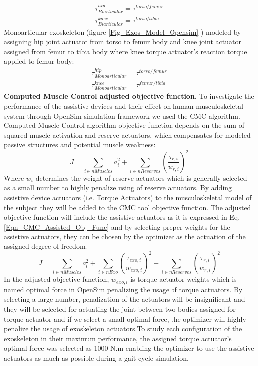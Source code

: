 \documentclass[10pt,letterpaper]{article}
\begin{document}
\begin{align}\label{Eqn_Biarticular_Torque_Act}
\tau^{hip}_{Biarticular} = \tau^{torso/femur}\\
\tau^{knee}_{Biarticular} = \tau^{torso/tibia}
\end{align}
Monoarticular exoskeleton (figure \ref{Fig_Exos_Model_Opensim} ) modeled by assigning hip joint actuator from torso to femur body and knee joint actuator assigned from femur to tibia body where knee torque actuator's reaction torque applied to femur body:
\begin{align}\label{Eqn_Monoarticular_Torque_Act}
\tau^{hip}_{Monoarticular} = \tau^{torso/femur}\\
\tau^{knee}_{Monoarticular} = \tau^{femur/tibia}
\end{align}
\newline
\newline
\textbf{Computed Muscle Control adjusted objective function.} To investigate the performance of the assistive devices and their effect on human musculoskeletal system through OpenSim simulation framework we used the CMC algorithm. Computed Muscle Control algorithm objective function depends on the sum of squared muscle activation and reserve actuators, which compensates for modeled passive structures and potential muscle weakness\cite{93}:
\begin{equation}\label{Eqn_CMC_Normal_Obj_Func}
J = \sum_{i\in nMuscles} a_{i}^{2} + \sum_{i \in nReserves} (\frac{\tau_{r,i}}{w_{r,i}})^2
\end{equation}
Where $w_i$ determines the weight of reserve actuators which is generally selected as a small number to highly penalize using of reserve actuators. By adding assistive device actuators (i.e. Torque Actuators) to the musculoskeletal model of the subject they will be added to the CMC tool objective function. The adjusted objective function will include the assistive actuators as it is expressed in Eq. \eqref{Eqn_CMC_Assisted_Obj_Func} and by selecting proper weights for the assistive actuators, they can be chosen by the optimizer as the actuation of the assigned degree of freedom.
\begin{equation}\label{Eqn_CMC_Assisted_Obj_Func}
	J = \sum_{i\in nMuscles} a_{i}^{2} + \sum_{i \in nExo} \left(\frac{\tau_{exo,i}}{w_{exo,i}}\right)^{2} +  \sum_{i \in nReserves} \left(\frac{\tau_{r,i}}{w_{r,i}}\right)^2
\end{equation}
In the adjusted objective function, $w_{exo,i}$ is torque actuator weights which is named optimal force in OpenSim \cite{93} penalizing the usage of torque actuators. By selecting a large number, penalization of the actuators will be insignificant and they will be selected for actuating the joint between two bodies assigned for torque actuator and if we select a small optimal force, the optimizer will highly penalize the usage of exoskeleton actuators.To study each configuration of the exoskeleton in their maximum performance, the assigned torque actuator's optimal force was selected as 1000 N.m enabling the optimizer to use the assistive actuators as much as possible during a gait cycle simulation.\\
\end{document}
